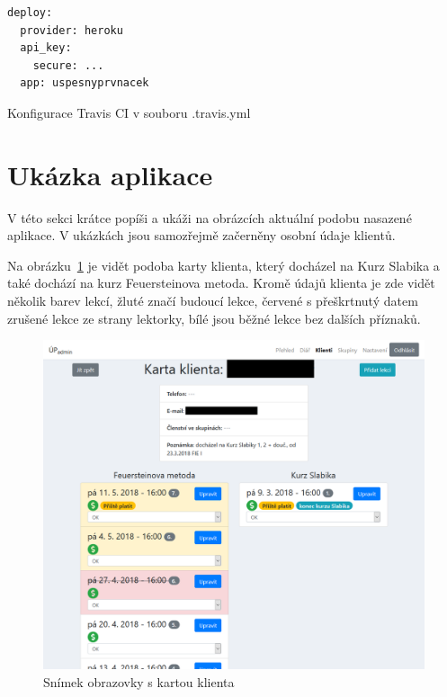     \begin{listing}[ht]
    	\begin{verbatim}
deploy:
  provider: heroku
  api_key:
    secure: ...
  app: uspesnyprvnacek
    	\end{verbatim}
    	\caption{Konfigurace Travis CI v souboru .travis.yml}\label{travis2}
    \end{listing}
    
    \section{Ukázka aplikace}
    V této sekci krátce popíši a ukáži na obrázcích aktuální podobu nasazené aplikace. V ukázkách jsou samozřejmě začerněny osobní údaje klientů.
    
    Na obrázku~\ref{fig:screen-karta} je vidět podoba karty klienta, který docházel na Kurz Slabika a také dochází na kurz Feuersteinova metoda. Kromě údajů klienta je zde vidět několik barev lekcí, žluté značí budoucí lekce, červené s přeškrtnutý datem zrušené lekce ze strany lektorky, bílé jsou běžné lekce bez dalších příznaků.
        
        \begin{figure}\centering
        	\includegraphics[width=1\textwidth]{img/screen-karta.png}
        	\caption{Snímek obrazovky s kartou klienta}\label{fig:screen-karta}
        \end{figure}
    
